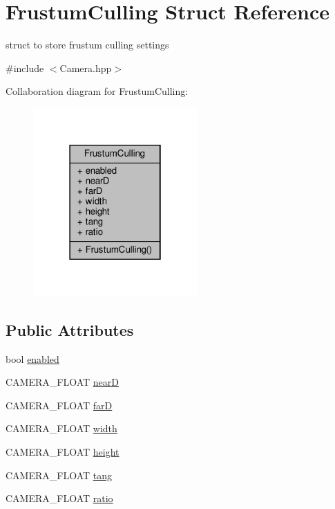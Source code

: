 \hypertarget{struct_frustum_culling}{}\section{Frustum\+Culling Struct Reference}
\label{struct_frustum_culling}


struct to store frustum culling settings  




{\ttfamily \#include $<$Camera.\+hpp$>$}



Collaboration diagram for Frustum\+Culling\+:
\nopagebreak
\begin{figure}[H]
\begin{center}
\leavevmode
\includegraphics[width=178pt]{struct_frustum_culling__coll__graph}
\end{center}
\end{figure}
\subsection*{Public Attributes}
\begin{DoxyCompactItemize}
\item 
bool \hyperlink{struct_frustum_culling_ac081fe3f11d9932a29a43e4c4f0a3122}{enabled}
\item 
C\+A\+M\+E\+R\+A\+\_\+\+F\+L\+O\+AT \hyperlink{struct_frustum_culling_a731441834fc14debb23a17b19371c9b4}{nearD}
\item 
C\+A\+M\+E\+R\+A\+\_\+\+F\+L\+O\+AT \hyperlink{struct_frustum_culling_ad9769fe6445a56f273ae7a9c2fef3d1a}{farD}
\item 
C\+A\+M\+E\+R\+A\+\_\+\+F\+L\+O\+AT \hyperlink{struct_frustum_culling_adf36d097760ff9e347789cdf75fde05b}{width}
\item 
C\+A\+M\+E\+R\+A\+\_\+\+F\+L\+O\+AT \hyperlink{struct_frustum_culling_ab675f4bf472ba3eb7d4b4afa9bcdae05}{height}
\item 
C\+A\+M\+E\+R\+A\+\_\+\+F\+L\+O\+AT \hyperlink{struct_frustum_culling_a1589c2a8155b217822c1332f1e7d8f68}{tang}
\item 
C\+A\+M\+E\+R\+A\+\_\+\+F\+L\+O\+AT \hyperlink{struct_frustum_culling_adb5f141092b327856b422ecd8f8b5f60}{ratio}
\end{DoxyCompactItemize}


